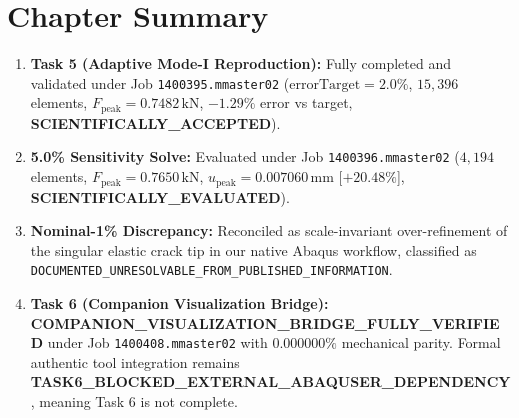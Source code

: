 \section{Chapter Summary}
\begin{enumerate}
  \item \textbf{Task 5 (Adaptive Mode-I Reproduction):} Fully completed and validated under Job \texttt{1400395.mmaster02} ($\text{errorTarget} = 2.0\%$, $15{,}396$ elements, $F_{\text{peak}} = 0.7482\,\mathrm{kN}$, $-1.29\%$ error vs target, \textbf{SCIENTIFICALLY\_ACCEPTED}).
  \item \textbf{5.0\% Sensitivity Solve:} Evaluated under Job \texttt{1400396.mmaster02} ($4{,}194$ elements, $F_{\text{peak}} = 0.7650\,\mathrm{kN}$, $u_{\text{peak}} = 0.007060\,\mathrm{mm}$ [$+20.48\%$], \textbf{SCIENTIFICALLY\_EVALUATED}).
  \item \textbf{Nominal-1\% Discrepancy:} Reconciled as scale-invariant over-refinement of the singular elastic crack tip in our native Abaqus workflow, classified as \texttt{DOCUMENTED\_UNRESOLVABLE\_FROM\_PUBLISHED\_INFORMATION}.
  \item \textbf{Task 6 (Companion Visualization Bridge):} \textbf{COMPANION\_VISUALIZATION\_BRIDGE\_FULLY\_VERIFIED} under Job \texttt{1400408.mmaster02} with $0.000000\%$ mechanical parity. Formal authentic tool integration remains \textbf{TASK6\_BLOCKED\_EXTERNAL\_ABAQUSER\_DEPENDENCY}, meaning Task 6 is not complete.
\end{enumerate}
